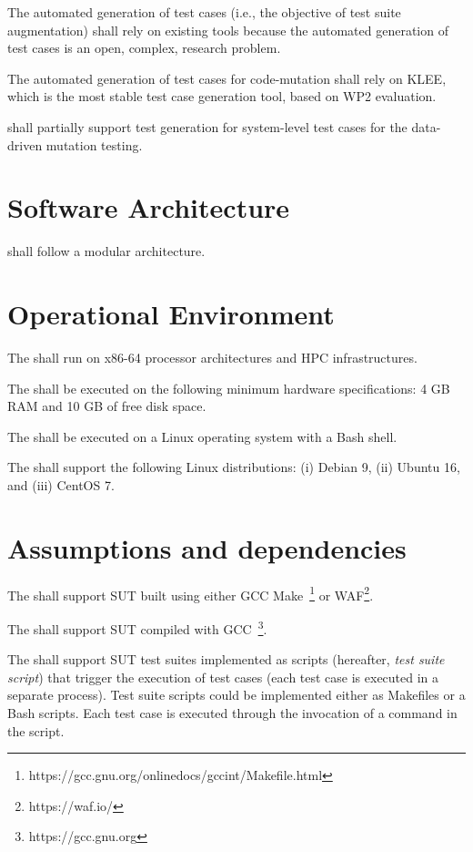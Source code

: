 \RQ{} The automated generation of test cases (i.e., the objective of test suite augmentation) shall rely on existing tools because the automated generation of test cases is an open, complex, research problem.  

\RQ{} The automated generation of test cases for code-mutation shall rely on KLEE, which is the most stable test case generation tool, based on WP2 evaluation.

\RQ{} \FAQAS shall partially support test generation for system-level test cases for the data-driven mutation testing.


\section{Software Architecture}

\RQ{} \FAQAS shall follow a modular architecture.

\section{Operational Environment}

\RQ{} The \FAQAS shall run on x86-64 processor architectures and HPC infrastructures.

\RQ{} The \FAQAS shall be executed on the following minimum hardware specifications: 4 GB RAM and 10 GB of free disk space.

\RQ{} The \FAQAS shall be executed on a Linux operating system with a Bash shell.

\RQ{} The \FAQAS shall support the following Linux distributions: (i) Debian 9, (ii) Ubuntu 16, and (iii) CentOS 7.

\section{Assumptions and dependencies}

\RQ{} The \FAQAS shall support SUT built using either GCC Make~\footnote{https://gcc.gnu.org/onlinedocs/gccint/Makefile.html} or WAF\footnote{https://waf.io/}.

\RQ{} The \FAQAS shall support SUT compiled with GCC~\footnote{https://gcc.gnu.org}.

\RQ{} The \FAQAS shall support SUT test suites implemented as scripts (hereafter, \emph{test suite script}) that trigger the execution of test cases (each test case is executed in a separate process). Test suite scripts could be implemented either as Makefiles or a Bash scripts. Each test case is executed through the invocation of a command in the script.



